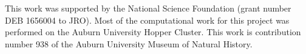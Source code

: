 This work was supported by the National Science Foundation (grant number DEB
1656004 to JRO).
Most of the computational work for this project was performed on the
Auburn University Hopper Cluster.
This work is contribution number 938 of the Auburn University
Museum of Natural History.
